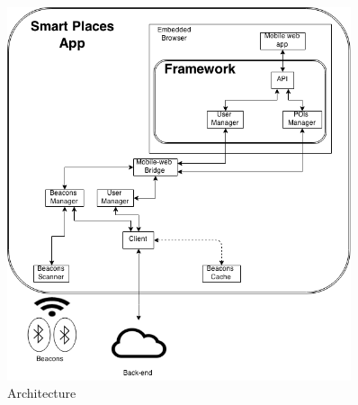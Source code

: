 \begin{figure}[!ht]
  \centering
    \includegraphics[width=0.9\textwidth]{img/architecture}
    \caption{Architecture}
    \label{fig:architecture}
\end{figure}

